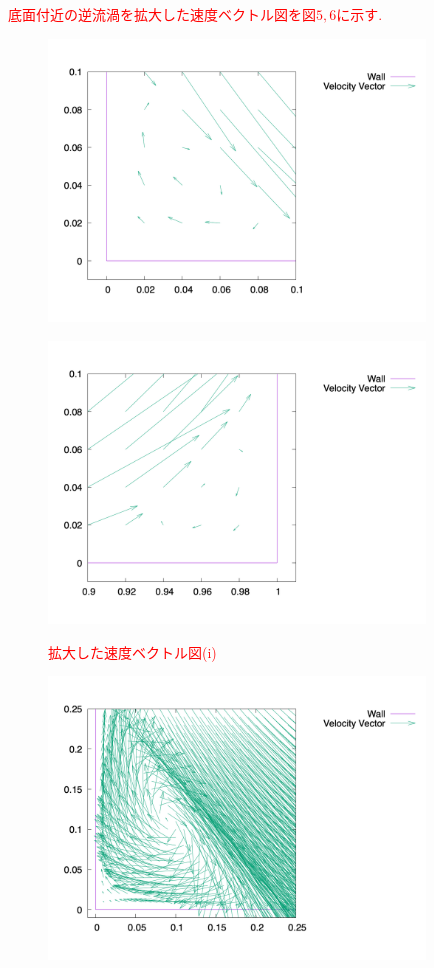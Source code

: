 \documentclass[upLaTeX,a4paper]{jsarticle}
\begin{document}
\textcolor{red}{
底面付近の逆流渦を拡大した速度ベクトル図を図$5,6$に示す.
\begin{figure}[H]
  \begin{minipage}[c]{0.45\linewidth}
    \centering
    \includegraphics[height=7.5cm]{outputs/img/velocity_vector_corner1_re50.png}
    \label{ラベル1}
  \end{minipage}
  \begin{minipage}[c]{0.45\linewidth}
    \centering
    \includegraphics[height=7.5cm]{outputs/img/velocity_vector_corner2_re50.png}
    \label{ラベル2}
  \end{minipage}
  \caption{拡大した速度ベクトル図(i)}\label{ラベル}
\end{figure}
\begin{figure}[H]
  \begin{minipage}[c]{0.45\linewidth}
    \centering
    \includegraphics[height=7.5cm]{outputs/img/velocity_vector_corner1_re200.png}

\end{minipage}
\end{figure}}
\end{document}
